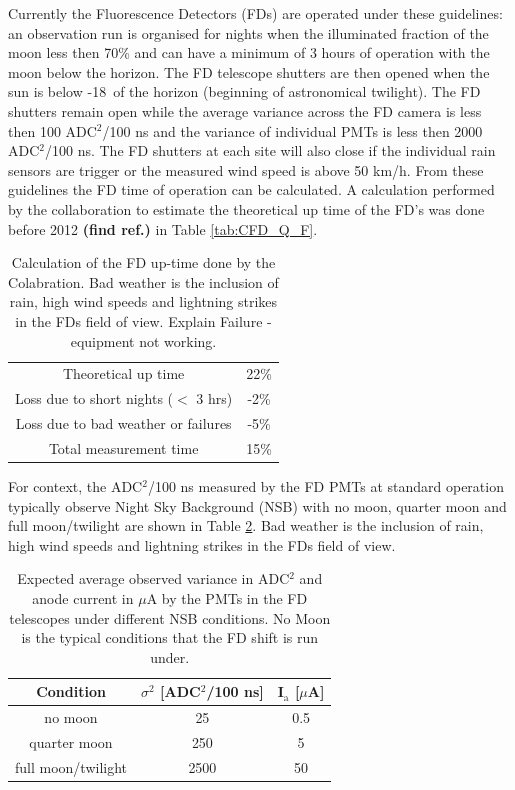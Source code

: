 Currently the Fluorescence Detectors (FDs) are operated under these guidelines: an observation run is organised for nights when the illuminated fraction of the moon less then 70\% and can have a minimum of 3 hours of operation with the moon below the horizon. The FD telescope shutters are then opened when the sun is below -18\textdegree \ of the horizon (beginning of astronomical twilight). The FD shutters remain open while the average variance across the FD camera is less then 100 ADC$^2$/100 ns and the variance of individual PMTs is less then 2000 ADC$^2$/100 ns. The FD shutters at each site will also close if the individual rain sensors are trigger or the measured wind speed is above 50 km/h.  From these guidelines the FD time of operation can be calculated. A calculation performed by the collaboration to estimate the theoretical up time of the FD's was done before 2012 \textbf{(find ref.)} in Table \ref{tab:CFD_Q_F}.
\begin{table}[h]
\centering
\begin{tabular}{c c}
\hline\hline
Theoretical up time & 22\% \\
Loss due to short nights ($<$ 3 hrs) & -2\% \\
Loss due to bad weather or failures & -5\% \\ \hline \hline
Total measurement time & 15\% \\
\hline\hline
\end{tabular}
\caption{Calculation of the FD up-time done by the Colabration. Bad weather is the inclusion of rain, high wind speeds and lightning strikes in the FDs field of view. Explain Failure - equipment not working.} \label{tab:FD_uptime}
\end{table}
For context, the ADC$^2$/100 ns measured by the FD PMTs at standard operation typically observe Night Sky Background (NSB) with no moon, quarter moon and full moon/twilight are shown in Table \ref{tab:MoonLightADC}. Bad weather is the inclusion of rain, high wind speeds and lightning strikes in the FDs field of view.
\begin{table}[h]
\centering
\begin{tabular}{c c c}
\hline\hline
Condition & $\sigma^2$ [ADC$^2$/100 ns] & I$_{\mathrm{a}}$ [$\mu$A] \\ \hline\hline
no moon & 25 & 0.5 \\
quarter moon & 250 & 5 \\
full moon/twilight & 2500 & 50 \\ 
\hline\hline
\end{tabular}
\caption{Expected average observed variance in ADC$^2$ and anode current in $\mu$A by the PMTs in the FD telescopes under different NSB conditions. No Moon is the typical conditions that the FD shift is run under.  } \label{tab:MoonLightADC}
\end{table}

